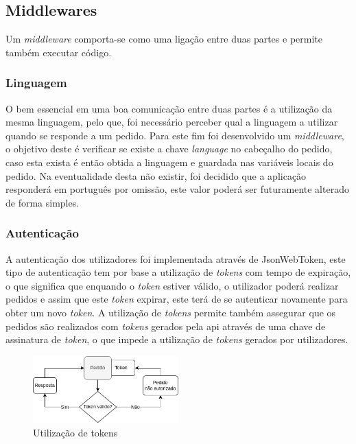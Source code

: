 \subsection{Middlewares} 
Um \textit{middleware} comporta-se como uma ligação entre duas partes e permite também executar código.

\subsubsection{Linguagem}
O bem essencial em uma boa comunicação entre duas partes é a utilização da mesma linguagem, pelo que, foi necessário perceber qual a linguagem a utilizar quando se responde a um pedido. Para este fim foi desenvolvido um \textit{middleware}, o objetivo deste é verificar se existe a chave \textit{language} no cabeçalho do pedido, caso esta exista é então obtida a linguagem e guardada nas variáveis locais do pedido. Na eventualidade desta não existir, foi decidido que a aplicação responderá em português por omissão, este valor poderá ser futuramente alterado de forma simples.

\newpage

\subsubsection{Autenticação}
A autenticação dos utilizadores foi implementada através de JsonWebToken, este tipo de autenticação tem por base a utilização de \textit{tokens} com tempo de expiração, o que significa que enquando o \textit{token} estiver válido, o utilizador poderá realizar pedidos e assim que este \textit{token} expirar, este terá de se autenticar novamente para obter um novo \textit{token}.
A utilização de \textit{tokens} permite também assegurar que os pedidos são realizados com \textit{tokens} gerados pela api através de uma chave de assinatura de \textit{token}, o que impede a utilização de \textit{tokens} gerados por utilizadores.
\begin{figure}[htb]
  \centering
  \includegraphics[width=0.5\textwidth]{images/implementacao/api/jwt_session.png}
  \caption{Utilização de tokens}
  \label{fig:64}
\end{figure}

